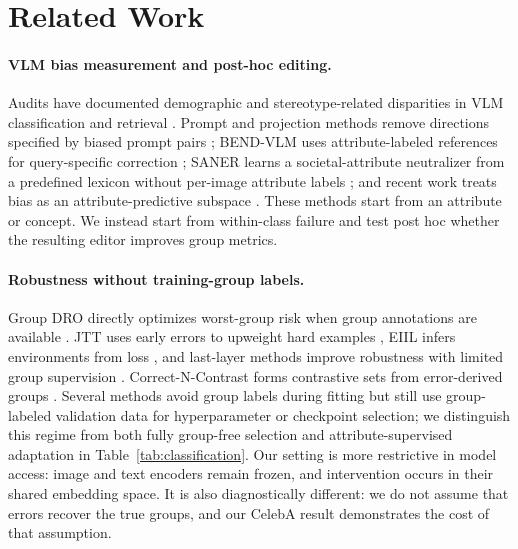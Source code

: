 \section{Related Work}
\paragraph{VLM bias measurement and post-hoc editing.}
Audits have documented demographic and stereotype-related disparities in VLM classification and retrieval \citep{agarwal2021evaluating,hall2023gender,zhou2022vlstereoset,hamidieh2024implicit}. Prompt and projection methods remove directions specified by biased prompt pairs \citep{berg2022prompt,chuang2023debiasing}; BEND-VLM uses attribute-labeled references for query-specific correction \citep{gerych2024bendvlm}; SANER learns a societal-attribute neutralizer from a predefined lexicon without per-image attribute labels \citep{hirota2025saner}; and recent work treats bias as an attribute-predictive subspace \citep{jung2024unified,zhao2026subspace}. These methods start from an attribute or concept. We instead start from within-class failure and test post hoc whether the resulting editor improves group metrics.

\paragraph{Robustness without training-group labels.}
Group DRO directly optimizes worst-group risk when group annotations are available \citep{sagawa2020groupdro}. JTT uses early errors to upweight hard examples \citep{liu2021jtt}, EIIL infers environments from loss \citep{creager2021eiil}, and last-layer methods improve robustness with limited group supervision \citep{kirichenko2023dfr,qiu2023afr}. Correct-N-Contrast forms contrastive sets from error-derived groups \citep{zhang2022correct}. Several methods avoid group labels during fitting but still use group-labeled validation data for hyperparameter or checkpoint selection; we distinguish this regime from both fully group-free selection and attribute-supervised adaptation in Table~\ref{tab:classification}. Our setting is more restrictive in model access: image and text encoders remain frozen, and intervention occurs in their shared embedding space. It is also diagnostically different: we do not assume that errors recover the true groups, and our CelebA result demonstrates the cost of that assumption.


